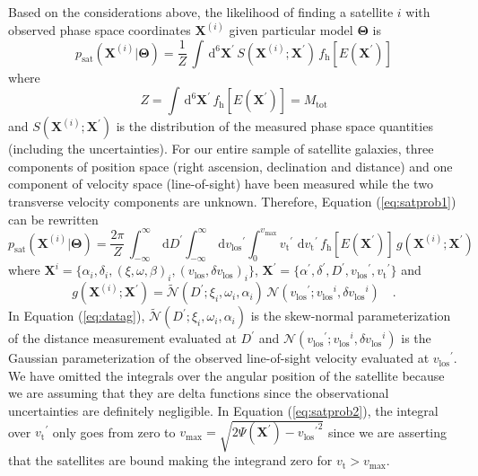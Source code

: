 \documentclass[preprint,12pt]{aastex}
\newcommand{\eqlabel}[1]{\label{eq:#1}}
\newcommand{\eq}[1]{Equation (\ref{eq:#1})}
\newcommand{\dd}{\,\mathrm{d}}
\newcommand{\bvec}[1]{\ensuremath{\boldsymbol{#1}}}
\newcommand{\normal}[3]{\ensuremath{\mathcal{N} (#1 ; #2, #3)}}
\newcommand{\skewnormal}[4]{\ensuremath{\tilde{\mathcal{N}} (#1 ; #2, #3, #4)}}
\renewcommand{\vector}[1]{\ensuremath{\bvec{#1}}}
\newcommand{\model}{\vector{\Theta}}
\newcommand{\data}{\vector{X}}
\newcommand{\prob}{\ensuremath{p}}
\newcommand{\pr}{\prob}
\newcommand{\df}{f}
\newcommand{\dfs}[1]{\df_\mathrm{#1}}
\newcommand{\dfhalo}{\dfs{\halo}}
\newcommand{\E}{\ensuremath{E}}
\newcommand{\halo}{\mathrm{h}}
\newcommand{\sat}{\mathrm{sat}}
\newcommand{\vlos}{\ensuremath{v_\mathrm{los}}}
\newcommand{\vtan}{\ensuremath{v_\mathrm{t}}}
\begin{document}
Based on the considerations above, the likelihood of finding a
satellite $i$ with observed phase space coordinates $\data^{(i)}$ given
particular model $\model$ is
\begin{equation}
    \eqlabel{satprob1}
    \pr_\sat (\data^{(i)} | \model) = \frac{1}{Z} \,
        \int \dd^6 \data^\prime \, S(\data^{(i)}; \data^\prime)
            \, \dfhalo [ \E (\data^\prime) ]
\end{equation}
where
\begin{equation}
    Z = \int \dd^6 \data^\prime \, \dfhalo [\E (\data^\prime)] = M_\mathrm{tot}
\end{equation}
and $S(\data^{(i)}; \data^\prime)$ is the distribution of the measured
phase space quantities (including the uncertainties).  For our entire
sample of satellite galaxies, three components of position space (right
ascension, declination and distance) and one component of velocity space
(line-of-sight) have been measured while the two transverse velocity
components are unknown.  Therefore, \eq{satprob1} can be rewritten
\begin{equation}
    \eqlabel{satprob2}
    \pr_\sat (\data^{(i)} | \model)
        = \frac{2 \pi}{Z} \,
            \int_{-\infty}^{\infty} \dd D^\prime
            \int_{-\infty}^{\infty} \dd \vlos^\prime
            \int_0 ^{v_\mathrm{max}} \vtan^\prime \, \dd \vtan^\prime
            \, \dfhalo \left [\E (\data^\prime)\right ]
                \, g (\data^{(i)}; \data^\prime)
\end{equation}
where $\data^{i} = \{\alpha_i, \delta_i, (\xi, \omega, \beta)_i,
(\vlos, \delta\vlos)_i \}$, $\data^\prime = \{ \alpha^\prime, \delta^\prime,
D^\prime, \vlos^\prime, \vtan^\prime \}$ and
\begin{equation}\eqlabel{datag}
    g (\data^{(i)}; \data^\prime)
    = \skewnormal{D^\prime}{\xi_i}{\omega_i}{\alpha_i} \,
        \normal{\vlos^\prime}{\vlos^{i}}{\delta\vlos^i} \quad .
\end{equation}
In \eq{datag}, \skewnormal{D^\prime}{\xi_i}{\omega_i}{\alpha_i} is the
skew-normal parameterization of the distance measurement evaluated at
$D^\prime$ and \normal{\vlos^\prime}{\vlos^{i}}{\delta\vlos^i} is the
Gaussian parameterization of the observed line-of-sight velocity evaluated
at $\vlos^\prime$. We have omitted the integrals over the angular position
of the satellite because we are assuming that they are delta functions since
the observational uncertainties are definitely negligible. In \eq{satprob2},
the integral over $\vtan^\prime$ only goes from zero to
$v_\mathrm{max} = \sqrt{2 \Psi(\data^\prime) - {\vlos^\prime}^2}$ since we
are asserting that the satellites are bound making the integrand zero for
$\vtan > v_\mathrm{max}$.
\end{document}
